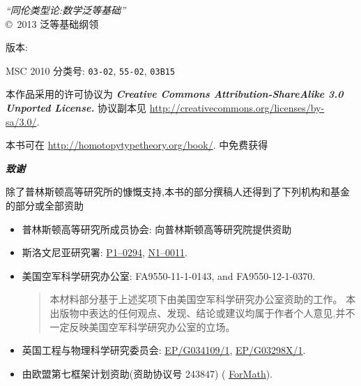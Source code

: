 \hbox{}
\vfill

{\small
\noindent
\emph{``同伦类型论:数学泛等基础''}\\
\copyright\ 2013 泛等基础纲领

\medskip
\noindent
版本: \texttt{\OPTversion}

\medskip
\noindent
MSC 2010 分类号:
\texttt{03-02},
\texttt{55-02},
\texttt{03B15}

\bigskip
\footnotesize

\noindent
本作品采用的许可协议为
\textbf{\emph{Creative Commons Attribution-ShareAlike 3.0 Unported License.}}
%
协议副本见
\url{http://creativecommons.org/licenses/by-sa/3.0/}.

\bigskip

\noindent
本书可在 \url{http://homotopytypetheory.org/book/}. 中免费获得

\bigskip

\noindent
\emph{\textbf{\small 致谢}}

\medskip

\noindent
除了普林斯顿高等研究所的慷慨支持,本书的部分撰稿人还得到了下列机构和基金的部分或全部资助
%
\begin{itemize}
\item 普林斯顿高等研究所成员协会: 向普林斯顿高等研究院提供资助 %
\item 斯洛文尼亚研究署:  %
\href{http://www.sicris.si/search/prg.aspx?id=6120}{P1--0294},
\href{http://www.sicris.si/search/prj.aspx?id=7109}{N1--0011}.

\item 美国空军科学研究办公室:
  FA9550-11-1-0143, and %
  FA9550-12-1-0370.  %
  {
    \setlength{\parskip}{0pt}
    \begin{quote}
      \noindent\scriptsize
      本材料部分基于上述奖项下由美国空军科学研究办公室资助的工作。
      本出版物中表达的任何观点、发现、结论或建议均属于作者个人意见,并不一定反映美国空军科学研究办公室的立场。
    \end{quote}
  }

\item 英国工程与物理科学研究委员会: %
   \href{http://gow.epsrc.ac.uk/NGBOViewGrant.aspx?GrantRef=EP/G034109/1}{EP/G034109/1}, %
   \href{http://gow.epsrc.ac.uk/NGBOViewGrant.aspx?GrantRef=EP/G03298X/1}{EP/G03298X/1}. %

\item 由欧盟第七框架计划资助(资助协议号 243847) (%
\href{http://wiki.portal.chalmers.se/cse/pmwiki.php/ForMath/ForMath/}{ForMath}). %


\end{itemize}}
